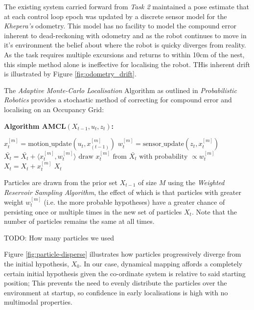 \documentclass[11pt, a4paper]{article}
\begin{document}
The existing system carried forward from \textit{Task 2}\cite{task2_report} maintained a pose estimate
that at each control loop epoch was updated by a discrete sensor model for the \textit{Khepera's} 
odometry. This model has no facility to model the compound error inherent to dead-reckoning with
odometry and as the robot continues to move in it's environment the belief about where the robot is quicky 
diverges from reality. As the task requires multiple excursions and returns to within 10cm of the nest,
this simple method alone is ineffective for localising the robot. THis inherent drift is illustrated by
Figure \ref{fig:odometry_drift}.

The \textit{Adaptive Monte-Carlo Localisation} Algorithm as outlined in 
\textit{Probabilistic Robotics}\cite{probabilisticrobot} provides a stochastic method of correcting
for compound error and localising on an Occupancy Grid:

\newpage
\textbf{\large Algorithm AMCL${(X_{t-1}, u_t, z_t)}$:}
\begin{algorithmic}
  \STATE $x_{t}^{[m]}= \textrm{motion\_update}(u_{t},x_{(t-1)}^{[m]})$
  \STATE $w_{t}^{[m]}= \textrm{sensor\_update}(z_{t},x_{t}^{[m]})$
  \STATE $\bar{X_{t}}=\bar{X_{t}}+\langle x_{t}^{[m]},w_{t}^{[m]}\rangle $
  \ENDFOR
  \STATE $\textrm{draw } x_{t}^{[m]} \textrm{ from } \bar{X_{t}} \textrm{ with probability } \propto w_{t}^{[m]}$
  \STATE $X_{t}=X_{t}+x_{t}^{[m]}$
  \ENDFOR
  \RETURN $X_{t}$
\end{algorithmic}

Particles are drawn from the prior set ${X_{t-1}}$ of size $M$ using the \textit{Weighted Reservoir 
Sampling Algorithm}\cite{reservoirsample}, the effect of which is that particles with greater 
weight ${w_t^{[m]}}$ (i.e. the more probable hypotheses) have a greater chance of persisting once 
or multiple times in the new set of particles ${X_t}$. Note that the number of particles remains 
the same at all times.

TODO: How many particles we used

Figure \ref{fig:particle-disperse} illustrates how particles progressively diverge from the initial 
hypothesis, ${X_0}$. In our case, dynamical mapping affords a completely certain initial hypothesis
given the co-ordinate system is relative to said starting position; This prevents the need to
evenly distribute the particles over the environment at startup, so confidence in early localisations
is high with no multimodal properties.
\end{document}
